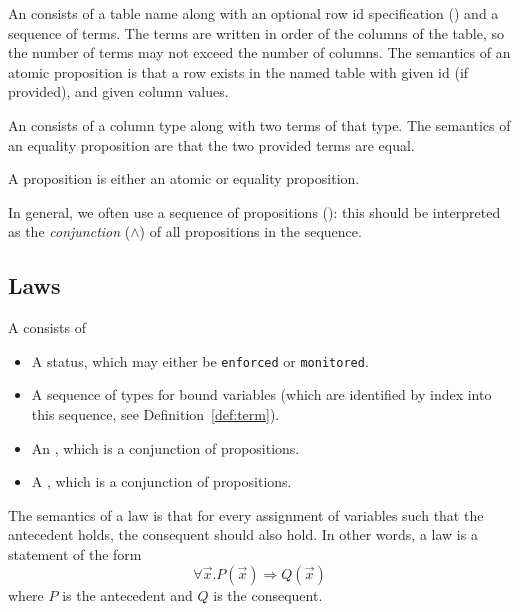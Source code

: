 \documentclass{scrartcl}
\begin{document}
\begin{definition} \label{def:atomic-proposition}
  An  consists of a table name along with an optional row id specification () and a sequence of terms. The terms are written in order of the columns of the table, so the number of terms may not exceed the number of columns. The semantics of an atomic proposition is that a row exists in the named table with given id (if provided), and given column values.
\end{definition}

\begin{definition} \label{def:equality-proposition}
  An  consists of a column type along with two terms of that type. The semantics of an equality proposition are that the two provided terms are equal.
\end{definition}

A proposition is either an atomic or equality proposition.

In general, we often use a sequence of propositions (): this should be interpreted as the \emph{conjunction} (\(\wedge\)) of all propositions in the sequence.

\subsection{Laws} \label{sec:laws}

\begin{definition}
  A  consists of
  \begin{itemize}
    \item A status, which may either be \verb|enforced| or \verb|monitored|.
    \item A sequence of types for bound variables (which are identified by index into this sequence, see Definition~\ref{def:term}).
    \item An , which is a conjunction of propositions.
    \item A , which is a conjunction of propositions.
  \end{itemize}
\end{definition}

The semantics of a law is that for every assignment of variables such that the antecedent holds, the consequent should also hold. In other words, a law is a statement of the form
%
\[ \forall \vec{x}. P(\vec{x}) \Rightarrow Q(\vec{x})\]
%
where \(P\) is the antecedent and \(Q\) is the consequent.
\end{document}
